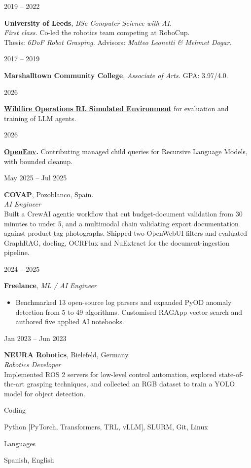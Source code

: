 \documentclass[10pt,a4paper]{article}
\newlength{\datecol}\setlength{\datecol}{34mm}
\newlength{\gapcol}\setlength{\gapcol}{6mm}
\newlength{\bodycol}
\newcommand{\cvsection}[1]{%
  \needspace{4\baselineskip}%
  \vspace{2mm}%
  \hspace*{\dimexpr\datecol+\gapcol\relax}{\LARGE #1}\par
  \vspace{1.4mm}}
\newcommand{\cventry}[2]{%
  \needspace{2\baselineskip}%
  \begin{minipage}[t]{\datecol}\raggedleft\strut #1\end{minipage}%
  \hspace{\gapcol}%
  \begin{minipage}[t]{\bodycol}\raggedright\strut #2\end{minipage}\par
  \vspace{0.85mm}}
\newcommand{\role}[1]{\textit{#1}}
\begin{document}
\cventry{2019 -- 2022}{%
  \textbf{University of Leeds}, \role{BSc Computer Science with AI.}\\
  \role{First class.} Co-led the robotics team competing at RoboCup.\\
  Thesis: \role{6DoF Robot Grasping.} Advisors: \role{Matteo Leonetti \& Mehmet Dogar.}}

\cventry{2017 -- 2019}{%
  \textbf{Marshalltown Community College}, \role{Associate of Arts.} GPA: 3.97/4.0.}

\cvsection{Work Experience \& Projects}

\cventry{2026}{\textbf{\href{https://github.com/jucamohedano/wildfire-response-env}{Wildfire Operations RL Simulated Environment}} for evaluation and training of LLM agents.}
\cventry{2026}{\textbf{\href{https://github.com/openenv/OpenEnv/pull/1527}{OpenEnv}.} Contributing managed child queries for Recursive Language Models, with bounded cleanup.}

\cventry{May 2025 -- Jul 2025}{%
  \textbf{COVAP}, Pozoblanco, Spain.\\
  \role{AI Engineer}\\
  Built a CrewAI agentic workflow that cut budget-document validation from 30 minutes
  to under 5, and a multimodal chain validating export documentation against
  product-tag photographs. Shipped two OpenWebUI filters and evaluated GraphRAG,
  docling, OCRFlux and NuExtract for the document-ingestion pipeline.}

\cventry{2024 -- 2025}{%
  \textbf{Freelance}, \role{ML / AI Engineer}
  \begin{itemize}
    \item Benchmarked 13 open-source log parsers and expanded PyOD anomaly detection
          from 5 to 49 algorithms. Customised RAGApp vector search and authored five
          applied AI notebooks.
  \end{itemize}}

\cventry{Jan 2023 -- Jun 2023}{%
  \textbf{NEURA Robotics}, Bielefeld, Germany.\\
  \role{Robotics Developer}\\
  Implemented ROS 2 servers for low-level control automation, explored
  state-of-the-art grasping techniques, and collected an RGB dataset to train a YOLO
  model for object detection.}

\cvsection{Skills}
\cventry{Coding}{Python [PyTorch, Transformers, TRL, vLLM], SLURM, Git, Linux}
\cventry{Languages}{Spanish, English}
\end{document}
